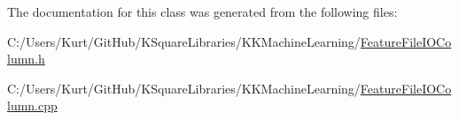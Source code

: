 The documentation for this class was generated from the following files\+:\begin{DoxyCompactItemize}
\item 
C\+:/\+Users/\+Kurt/\+Git\+Hub/\+K\+Square\+Libraries/\+K\+K\+Machine\+Learning/\hyperlink{_feature_file_i_o_column_8h}{Feature\+File\+I\+O\+Column.\+h}\item 
C\+:/\+Users/\+Kurt/\+Git\+Hub/\+K\+Square\+Libraries/\+K\+K\+Machine\+Learning/\hyperlink{_feature_file_i_o_column_8cpp}{Feature\+File\+I\+O\+Column.\+cpp}\end{DoxyCompactItemize}
